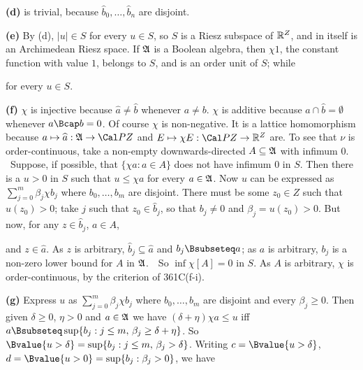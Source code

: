 {\medskip

{\bf (d)} is trivial, because $\widehat{b}_0,\ldots,\widehat{b}_n$ are
disjoint.

\medskip

{\bf (e)} By (d), $|u|\in S$ for every $u\in S$, so $S$ is a Riesz
subspace of $\Bbb R^Z$, and in itself is an Archimedean Riesz space.
If $\frak A$ is a Boolean algebra, then $\chi 1$, the constant function
with value $1$, belongs to $S$, and is an order unit of $S$;  while


\noindent for every $u\in S$.

\medskip

{\bf (f)} $\chi$ is injective because $\widehat{a}\ne\widehat{b}$
whenever $a\ne b$.   $\chi$ is additive because
$\widehat{a}\cap\widehat{b}=\emptyset$
whenever $a\Bcap b=0$.   Of course $\chi$ is non-negative.
It is a lattice
homomorphism because $a\mapsto\widehat{a}:\frak A\to\Cal PZ$ and
$E\mapsto\chi E:\Cal PZ\to\Bbb R^Z$ are.   To see that $\nu$
is order-continuous, take a
non-empty downwards-directed $A\subseteq\frak A$ with infimum $0$.
\Quer\  Suppose, if possible, that $\{\chi a:a\in A\}$ does not have
infimum $0$ in $S$.   Then there is a $u>0$ in $S$ such that
$u\le\chi a$ for every $a\in\frak A$.  Now $u$ can be expressed as
$\sum_{j=0}^m\beta_j\chi b_j$ where $b_0,\ldots,b_m$ are disjoint.   There
must be some $z_0\in Z$ such that $u(z_0)>0$;  take $j$ such that
$z_0\in\widehat{b}_j$, so that $b_j\ne 0$ and $\beta_j=u(z_0)>0$.   But
now, for any $z\in\widehat{b}_j$, $a\in A$,


\noindent and $z\in\widehat{a}$.   As $z$ is arbitrary,
$\widehat{b}_j\subseteq\widehat{a}$
and $b_j\Bsubseteq a$;  as $a$ is arbitrary,  $b_j$ is a non-zero lower
bound for $A$ in $\frak A$.\ \BanG\   So $\inf\chi[A]=0$ in $S$.   As
$A$ is arbitrary, $\chi$ is order-continuous, by the criterion of
361C(f-i).

\medskip

{\bf (g)} Express $u$ as $\sum_{j=0}^m\beta_j\chi b_j$ where
$b_0,\ldots,b_m$ are disjoint and every $\beta_j\ge 0$.   Then given
$\delta\ge 0$, $\eta>0$ and $a\in\frak A$ we have
$(\delta+\eta)\chi a\le u$ iff
$a\Bsubseteq\sup\{b_j:j\le m,\,\beta_j\ge\delta+\eta\}$.   So
$\Bvalue{u>\delta}=\sup\{b_j:j\le m,\,\beta_j>\delta\}$.   Writing
$c=\Bvalue{u>\delta}$, $d=\Bvalue{u>0}=\sup\{b_j:\beta_j>0\}$, we have

}
